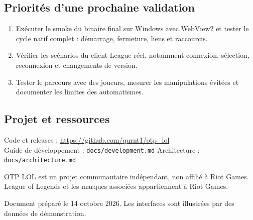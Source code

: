 \documentclass[10pt,a4paper]{article}
\begin{document}
\subsection*{Priorités d'une prochaine validation}
\begin{enumerate}[leftmargin=1.5em,itemsep=2pt,topsep=3pt]
  \item Exécuter le smoke du binaire final sur Windows avec WebView2 et tester le cycle natif complet : démarrage, fermeture, liens et raccourcis.
  \item Vérifier les scénarios du client League réel, notamment connexion, sélection, reconnexion et changements de version.
  \item Tester le parcours avec des joueurs, mesurer les manipulations évitées et documenter les limites des automatismes.
\end{enumerate}

\subsection*{Projet et ressources}
Code et releases : \url{https://github.com/qurnt1/otp_lol}\\
Guide de développement : \texttt{docs/development.md} \quad\textbar\quad Architecture : \texttt{docs/architecture.md}

\vfill
{\small\color{muted}OTP LOL est un projet communautaire indépendant, non affilié à Riot Games. League of Legends et les marques associées appartiennent à Riot Games.}\par
{\small\color{muted}Document préparé le 14 octobre 2026. Les interfaces sont illustrées par des données de démonstration.}
\end{document}
